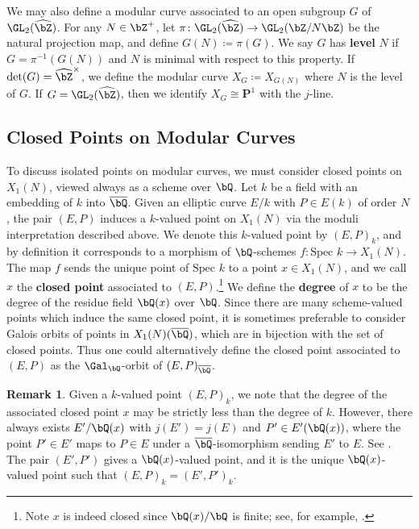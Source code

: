 \documentclass[11pt,reqno]{amsart}
\theoremstyle{plain}
\theoremstyle{definition}
\newtheorem{remark}[theorem]{Remark}
\newcommand{\Q}{\bQ}
\newcommand{\Z}{\bZ}
\newcommand{\PP}{\mathbf P}
\begin{document}
We may also define a modular curve associated to an open subgroup $G$ of $\GL_2(\widehat{\Z})$. For any $N \in \Z^+$, let $\pi\colon\GL_2(\widehat{\Z}) \rightarrow \GL_2(\Z/N\Z)$ be the natural projection map, and define $G(N) \coloneqq \pi(G)$. We say $G$ has \textbf{level} $N$ if $G=\pi^{-1}(G(N))$ and $N$ is minimal with respect to this property. If $\det(G)=\widehat{\Z}^{\times}$, we define the modular curve $X_G \coloneqq X_{G(N)}$ where $N$ is the level of $G$. If $G=\GL_2(\widehat{\Z})$, then we identify $X_G \cong \PP^1$ with the $j$-line.

\subsection{Closed Points on Modular Curves} \label{sec:ClosedPts} To discuss isolated points on modular curves, we must consider closed points on $X_1(N)$, viewed always as a scheme over $\Q$. Let $k$ be a field with an embedding of $k$ into $\overline \Q$. Given an elliptic curve $E/k$ with $P \in E(k)$ of order $N$, the pair $(E,P)$ induces a $k$-valued point on $X_1(N)$ via the moduli interpretation described above. We denote this $k$-valued point by $(E,P)_k$, and by definition it corresponds to a morphism of $\Q$-schemes $f\colon\text{Spec } k \rightarrow X_1(N)$. The map $f$ sends the unique point of $\text{Spec } k$ to a point $x \in X_1(N)$, and we call $x$ the \textbf{closed point} associated to $(E,P)$.\footnote{Note $x$ is indeed closed since $\Q(x)/\Q$ is finite; see, for example, \cite[Exercise~5.9, p.~76]{Liu2002}.} We define the \textbf{degree} of $x$ to be the degree of the residue field $\Q(x)$ over $\Q$. Since there are many scheme-valued points which induce the same closed point, it is sometimes preferable to consider Galois orbits of points in $X_1(N)(\overline{\Q})$, which are in bijection with the set of closed points. Thus one could alternatively define the closed point associated to $(E,P)$ as the $\Gal_\Q$-orbit of $(E,P)_{\overline{\Q}}$.

\begin{remark} Given a $k$-valued point $(E,P)_k$, we note that the degree of the associated closed point $x$ may be strictly less than the degree of $k$. However, there always exists $E'/\Q(x)$ with $j(E')=j(E)$ and $P' \in E'(\Q(x))$, where the point $P' \in E'$ maps to $P \in E$ under a $\overline \Q$-isomorphism sending $E'$ to $E$. See \cite[p.~274, Proposition~VI.3.2]{DR}. The pair $(E',P')$ gives a $\Q(x)$-valued point, and it is the unique $\Q(x)$-valued point such that $(E,P)_{k}=(E',P')_{k}.$
\end{remark}
\end{document}
